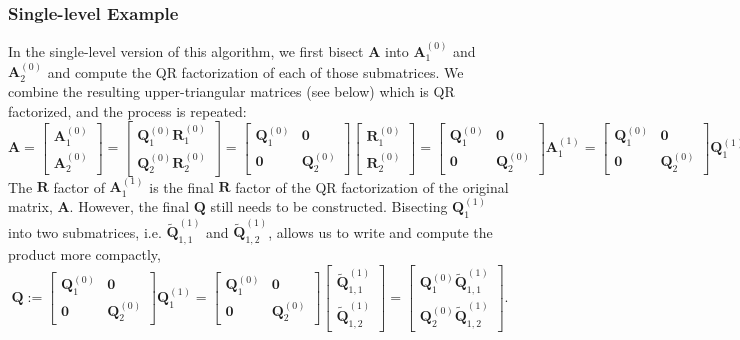 \documentclass[review,onefignum,onetabnum]{siamart190516}
\newcommand{\bb}[1]{\mathbf{#1}}
\begin{document}
\subsubsection{Single-level Example}
\label{Qdetails}
In the single-level version of this algorithm, we first bisect $\bb{A}$  into $\bb{A}_1^{(0)}$ and $\bb{A}_2^{(0)}$ and compute the QR factorization of each of those submatrices.
We combine the resulting upper-triangular matrices (see below)
which is QR factorized, and the process is repeated:
\[
\bb{A} = \begin{bmatrix}
\bb{A}_1^{(0)}\\
\bb{A}_2^{(0)}
\end{bmatrix} = \begin{bmatrix}
\bb{Q}_1^{(0)}\bb{R}_1^{(0)}\\
\bb{Q}_2^{(0)}\bb{R}_2^{(0)}
\end{bmatrix} = \begin{bmatrix}
\bb{Q}_1^{(0)} & \bb{0}\\
\bb{0} & \bb{Q}_2^{(0)}
\end{bmatrix} \begin{bmatrix}
\bb{R}_1^{(0)} \\
\bb{R}_2^{(0)}
\end{bmatrix} =\begin{bmatrix}
\bb{Q}_1^{(0)} & \bb{0}\\
\bb{0} & \bb{Q}_2^{(0)}
\end{bmatrix} \bb{A}_1^{(1)} =\begin{bmatrix}
\bb{Q}_1^{(0)} & \bb{0}\\
\bb{0} & \bb{Q}_2^{(0)}
\end{bmatrix} \bb{Q}_1^{(1)}\bb{R}.
\] 
The $\bb{R}$ factor of $\bb{A}_1^{(1)}$ is the final $\bb{R}$ factor of the QR factorization of the original matrix, $\bb{A}$. 
However, the final $\bb{Q}$ still needs to be constructed.
Bisecting  $\bb{Q}_1^{(1)}$ into two submatrices, i.e. $\tilde{\bb{Q}}_{1,1}^{(1)}$ and $\tilde{\bb{Q}}_{1,2}^{(1)}$, allows us to write and compute the product more compactly,  \[
\bb{Q}:=\begin{bmatrix}
\bb{Q}_1^{(0)} & \bb{0}\\
\bb{0} & \bb{Q}_2^{(0)}
\end{bmatrix} \bb{Q}_1^{(1)} =    \begin{bmatrix}
\bb{Q}_1^{(0)} & \bb{0}\\
\bb{0} & \bb{Q}_2^{(0)}
\end{bmatrix} \begin{bmatrix}
\tilde{\bb{Q}}_{1,1}^{(1)}\\
\tilde{\bb{Q}}_{1,2}^{(1)}
\end{bmatrix}= \begin{bmatrix}
\bb{Q}_1^{(0)}\tilde{\bb{Q}}_{1,1}^{(1)} \\ 
\bb{Q}_2^{(0)}\tilde{\bb{Q}}_{1,2}^{(1)}
\end{bmatrix}. \]
\end{document}
